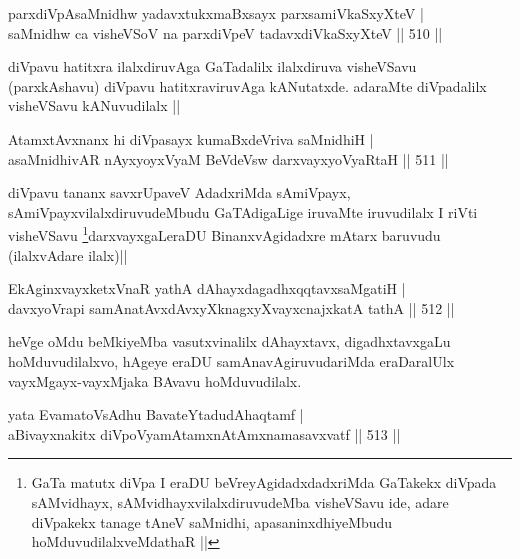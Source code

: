 
\begin{shl}
parxdiVpAsaMnidhw yadavxtukxmaBxsayx parxsamiVkaSxyXteV | \\
saMnidhw ca visheVSoV na parxdiVpeV tadavxdiVkaSxyXteV \hfill||  510 || 
\end{shl}

\begin{artha}
diVpavu hatitxra ilalxdiruvAga GaTadalilx ilalxdiruva visheVSavu (parxkAshavu) diVpavu hatitxraviruvAga kANutatxde. adaraMte diVpadalilx visheVSavu kANuvudilalx ||
\end{artha}


\begin{shl}
AtamxtAvxnanx hi diVpasayx kumaBxdeVriva saMnidhiH | \\
asaMnidhivAR nAyxyoyxV\s yaM BeVdeV\s sw darxvayxyoVyaRtaH \hfill||  511 ||  
\end{shl}

\begin{artha}
diVpavu tananx savxrUpaveV AdadxriMda sAmiVpayx, sAmiVpayxvilalxdiruvudeMbudu GaTAdigaLige iruvaMte iruvudilalx I riVti visheVSavu \footnote{GaTa matutx diVpa I eraDU beVreyAgidadxdadxriMda GaTakekx diVpada sAMvidhayx, sAMvidhayxvilalxdiruvudeMba visheVSavu ide, adare diVpakekx tanage tAneV saMnidhi, apasaninxdhiyeMbudu hoMduvudilalxveMdathaR ||}darxvayxgaLeraDU BinanxvAgidadxre mAtarx baruvudu (ilalxvAdare ilalx)||
\end{artha}


\begin{shl}
EkAginxvayxketxVnaR yathA dAhayxdagadhxqqtavxsaMgatiH | \\
davxyoVrapi samAnatAvxdAvxyXknagxyXvayxcnajxkatA tathA \hfill||  512 ||  
\end{shl}

\begin{artha}
heVge oMdu beMkiyeMba vasutxvinalilx dAhayxtavx, digadhxtavxgaLu hoMduvudilalxvo, hAgeye eraDU samAnavAgiruvudariMda eraDaralUlx vayxMgayx-vayxMjaka BAvavu hoMduvudilalx. 
\end{artha}

\begin{shl}
yata EvamatoV\s sAdhu BavateYtadudAhaqtamf | \\
aBivayxnakitx diVpoV\s yamAtamxnA\s \s tAmxnamasavxvatf \hfill||  513 ||  
\end{shl}

